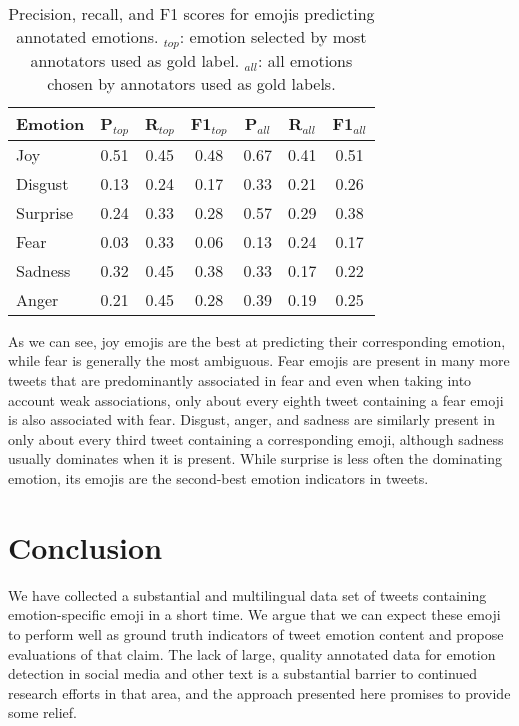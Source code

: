 \documentclass[10pt, a4paper]{article}
\begin{document}
\begin{table}[]
\centering
\begin{tabular}{l | c | c | c | c | c | c}
\textbf{Emotion} & \textbf{P$_{top}$} & \textbf{R$_{top}$} & \textbf{F1$_{top}$} & \textbf{P$_{all}$} & \textbf{R$_{all}$} & \textbf{F1$_{all}$} \\\hline
Joy & 0.51 & 0.45 & 0.48 & 0.67 & 0.41 & 0.51 \\
Disgust & 0.13 & 0.24 & 0.17 & 0.33 & 0.21 & 0.26 \\
Surprise & 0.24 & 0.33 & 0.28 & 0.57 & 0.29 & 0.38 \\
Fear & 0.03 & 0.33 & 0.06 & 0.13 & 0.24 & 0.17 \\
Sadness & 0.32 & 0.45 & 0.38 & 0.33 & 0.17 & 0.22 \\
Anger & 0.21 & 0.45 & 0.28 & 0.39 & 0.19 & 0.25
\end{tabular}
\caption{Precision, recall, and F1 scores for emojis predicting annotated emotions. $_{top}$: emotion selected by most annotators used as gold label. $_{all}$: all emotions chosen by annotators used as gold labels.}
\label{tab:precision_emojis}
\end{table}

As we can see, joy emojis are the best at predicting their corresponding emotion, while fear is generally the most ambiguous. Fear emojis are present in many more tweets that are predominantly associated in fear and even when taking into account weak associations, only about every eighth tweet containing a fear emoji is also associated with fear. Disgust, anger, and sadness are similarly present in only about every third tweet containing a corresponding emoji, although sadness usually dominates when it is present. While surprise is less often the dominating emotion, its emojis are the second-best emotion indicators in tweets.

\section{Conclusion}

We have collected a substantial and multilingual data set of tweets containing emotion-specific emoji in a short time. We argue that we can expect these emoji to perform well as ground truth indicators of tweet emotion content and propose evaluations of that claim. 
The lack of large, quality annotated data for emotion detection in social media and other text is a substantial barrier to continued research efforts in that area, and the approach presented here promises to provide some relief.
\end{document}
